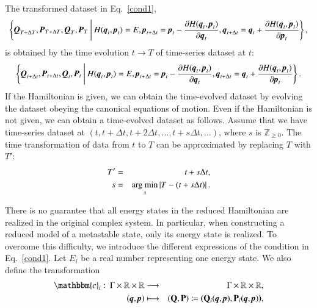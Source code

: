 \documentclass[preprint,
bibnotes,
 amsmath,amssymb,
 aps,
]{revtex4-1}
\newcommand{\argmin}{\mathop{\rm arg~min}\limits}
\newcounter{num}
\begin{document}
The transformed dataset in Eq.~\eqref{cond1},
\begin{equation}
\left\{\textit{\textbf{Q}}_{T+\Delta T},\textit{\textbf{P}}_{T+\Delta T},\textit{\textbf{Q}}_{T},\textit{\textbf{P}}_{T}\:\middle|\: H(\textit{\textbf{q}}_t,\textit{\textbf{p}}_t) = E,  {\textit{\textbf{p}}}_{t+\Delta t} = {\textit{\textbf{p}}}_t-\frac{\partial{H(\textit{\textbf{q}}_t,\textit{\textbf{p}}_t)}}{\partial{\textit{\textbf{q}}}_t}, \textit{\textbf{q}}_{t+\Delta t} = \textit{\textbf{q}}_t + \frac{\partial{H(\textit{\textbf{q}}_t,\textit{\textbf{p}}_t)}}{\partial{\textit{\textbf{p}}_t}}\right\},
\end{equation}
is obtained by the time evolution $t \to T$ of time-series dataset at $t$:
\begin{equation}
\left\{\textit{\textbf{Q}}_{t+\Delta t},\textit{\textbf{P}}_{t+\Delta t},\textit{\textbf{Q}}_{t},\textit{\textbf{P}}_{t}\:\middle|\: H(\textit{\textbf{q}}_t,\textit{\textbf{p}}_t) = E,  {\textit{\textbf{p}}}_{t+\Delta t} = {\textit{\textbf{p}}}_t-\frac{\partial{H(\textit{\textbf{q}}_t,\textit{\textbf{p}}_t)}}{\partial{\textit{\textbf{q}}}_t}, \textit{\textbf{q}}_{t+\Delta t} = \textit{\textbf{q}}_t + \frac{\partial{H(\textit{\textbf{q}}_t,\textit{\textbf{p}}_t)}}{\partial{\textit{\textbf{p}}_t}}\right\}. 
\end{equation}
If the Hamiltonian is given, we can obtain the time-evolved dataset by evolving the dataset obeying the canonical equations of motion. Even if the Hamiltonian is not given, we can obtain a time-evolved dataset as follows. Assume that we have time-series dataset at
$(t, t + \Delta t, t + 2\Delta t, \dots , t + s\Delta t,\dots )$, where $s$ is $\mathbb{Z}_{\geq 0}$. The time transformation of data from $t$ to $T$ can be approximated by replacing $T$ with $T'$: 
\begin{eqnarray}
T' &=& t + s\Delta t,\\
s &=& \argmin_{s} \left|T-(t + s\Delta t)\right|.
\end{eqnarray}\par
There is no guarantee that all energy states in the reduced Hamiltonian are realized in the original complex system. 
In particular, when constructing a reduced model of a metastable state, only its energy state is realized. 
To overcome this difficulty, we introduce the different expressions of the condition in Eq.~\eqref{cond1}. 
Let $E_i$ be a real number representing one energy state. 
We also define the transformation
\begin{eqnarray}
\mathbbm{c}_i:\: \Gamma \times \mathbb{R} \times \mathbb{R} &\longrightarrow& \Gamma \times \mathbb{R} \times \mathbb{R},\\ 
\:(\textit{\textbf{q}},\textit{\textbf{p}}) &\longmapsto& (\mathbf{Q},\mathbf{P}) \coloneqq \textbf{(}\mathbf{Q}_i(\textit{\textbf{q}},\textit{\textbf{p}}),\mathbf{P}_i(\textit{\textbf{q}},\textit{\textbf{p}})\textbf{)},
\end{eqnarray}
\end{document}
